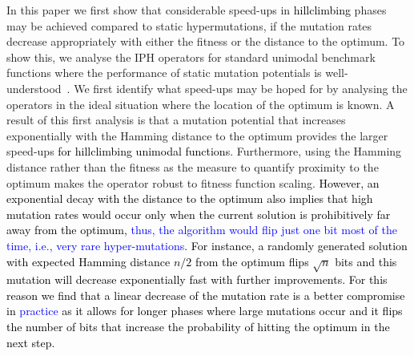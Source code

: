 \documentclass[lettersize,journal]{IEEEtran}
\newcommand{\new}[1]{\textcolor{black}{#1}}
\newcommand{\rev}[1]{\textcolor{blue}{#1}}
\begin{document}
In this paper we first show that considerable speed-ups in \new{hillclimbing} phases may be achieved compared to static hypermutations, 
if the mutation rates decrease appropriately with either the fitness or the distance to the optimum. 
To show this, we analyse the IPH operators for standard unimodal benchmark functions where the performance of static mutation potentials is well-understood~\cite{CorusOlivetoYazdani2019TCS}.
We first identify what speed-ups may be hoped for by analysing the operators in the ideal situation where the location of the optimum is known.
A result of this first analysis is that a mutation potential that increases exponentially with the Hamming distance to the optimum provides the larger speed-ups \new{for hillclimbing unimodal functions}. Furthermore, using the Hamming distance rather than the fitness as the measure to quantify proximity to the optimum
makes the operator robust to fitness function scaling.
\new{However, an exponential decay with the distance to the optimum also implies that high mutation rates would occur only when the current solution is prohibitively far away from the optimum, \rev{thus, the algorithm would flip just one bit most of the time, i.e., very rare hyper-mutations}. For instance, a randomly generated solution with expected Hamming distance $n/2$ from the optimum flips $\sqrt{n}$ bits and this mutation will decrease exponentially fast with further improvements. For this reason we find that a linear decrease of the mutation rate is a better compromise in \rev{practice} as it allows for longer phases where large mutations occur} \textcolor{black}{ and it flips the number of bits that increase the probability of hitting the optimum in the next step.}
\end{document}
